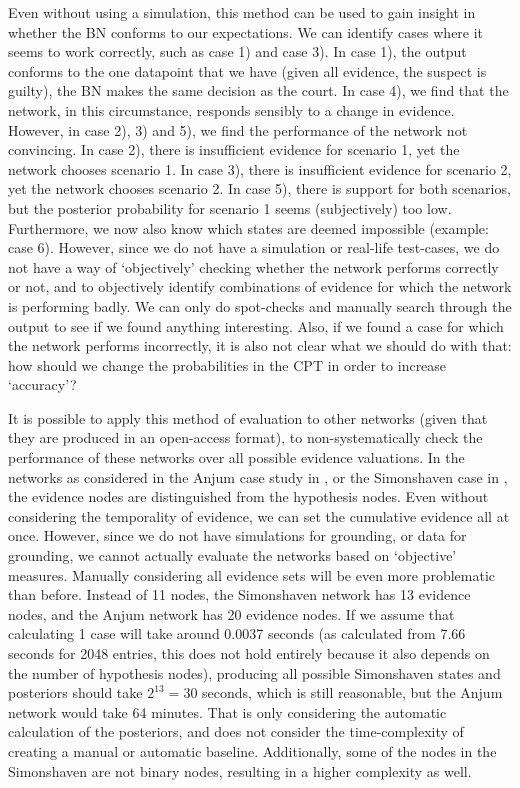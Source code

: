\documentclass[12pt]{article}
\begin{document}
Even without using a simulation, this method can be used to gain insight in whether the BN conforms to our expectations. We can identify cases where it seems to work correctly, such as case 1) and case 3). In case 1), the output conforms to the one datapoint that we have (given all evidence, the suspect is guilty), the BN makes the same decision as the court. In case 4), we find that the network, in this circumstance, responds sensibly to a change in evidence. However, in case 2), 3) and 5), we find the performance of the network not convincing. In case 2), there is insufficient evidence for scenario 1, yet the network chooses scenario 1. In case 3), there is insufficient evidence for scenario 2, yet the network chooses scenario 2. In case 5), there is support for both scenarios, but the posterior probability for scenario 1 seems (subjectively) too low. Furthermore, we now also know which states are deemed impossible (example: case 6). However, since we do not have a simulation or real-life test-cases, we do not have a way of `objectively' checking whether the network performs correctly or not, and to objectively identify combinations of evidence for which the network is performing badly. We can only do spot-checks and manually search through the output to see if we found anything interesting. Also, if we found a case for which the network performs incorrectly, it is also not clear what we should do with that: how should we change the probabilities in the CPT in order to increase `accuracy'?

It is possible to apply this method of evaluation to other networks (given that they are produced in an open-access format), to non-systematically check the performance of these networks over all possible evidence valuations. In the networks as considered in the Anjum case study in \citet{vlek2016}, or the Simonshaven case in \citet{Fenton2019}, the evidence nodes are distinguished from the hypothesis nodes. Even without considering the temporality of evidence, we can set the cumulative evidence all at once. However, since we do not have simulations for grounding, or data for grounding, we cannot actually evaluate the networks based on `objective' measures. Manually considering all evidence sets will be even more problematic than before. Instead of 11 nodes, the Simonshaven network has 13 evidence nodes, and the Anjum network has 20 evidence nodes. If we assume that calculating 1 case will take around 0.0037 seconds (as calculated from 7.66 seconds for 2048 entries, this does not hold entirely because it also depends on the number of hypothesis nodes), producing all possible Simonshaven states and posteriors should take $2^{13} = 30$ seconds, which is still reasonable, but the Anjum network would take 64 minutes. That is only considering the automatic calculation of the posteriors, and does not consider the time-complexity of creating a manual or automatic baseline. Additionally, some of the nodes in the Simonshaven are not binary nodes, resulting in a higher complexity as well.
\end{document}
